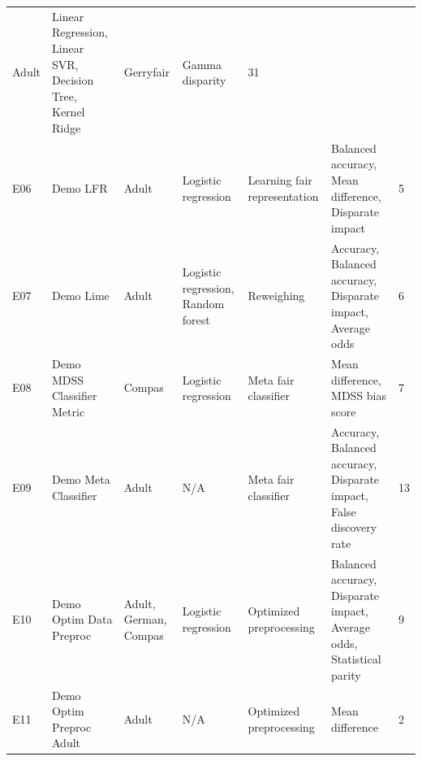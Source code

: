 \documentclass[sigconf,review]{acmart}
\begin{document}
\begin{table}[]
\begin{tabular}{ p{1em} L{10em} R{4em} R{8em} R{9em} R{12em} R{2.5em} }
		Adult &
		Linear Regression, Linear SVR, Decision Tree, Kernel Ridge &
		Gerryfair &
		Gamma disparity &
		31 \\
		E06 &
		Demo LFR &
		Adult &
		Logistic regression &
		Learning fair representation &
		Balanced accuracy, Mean difference, Disparate impact &
		5 \\
		E07 &
		Demo Lime &
		Adult &
		Logistic regression, Random forest &
		Reweighing &
		Accuracy, Balanced accuracy, Disparate impact, Average odds &
		6 \\
		E08 &
		Demo MDSS Classifier Metric &
		Compas &
		Logistic regression &
		Meta fair classifier &
		Mean difference, MDSS bias score &
		7 \\
		E09 &
		Demo Meta Classifier &
		Adult &
		N/A &
		Meta fair classifier &
		Accuracy, Balanced accuracy, Disparate impact, False discovery rate &
		13 \\
		E10 &
		Demo Optim Data Preproc &
		Adult, German, Compas &
		Logistic regression &
		Optimized preprocessing &
		Balanced accuracy, Disparate impact, Average odds, Statistical parity &
		9 \\
		E11 &
		Demo Optim Preproc Adult &
		Adult &
		N/A &
		Optimized preprocessing &
		Mean difference &
		2 \\
	 	\hline
	\end{tabular}
\end{table}
\end{document}
